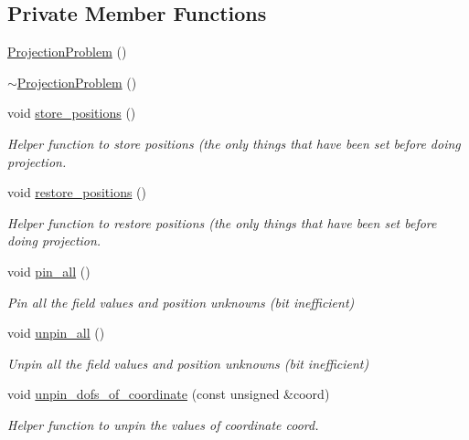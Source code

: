 \subsection*{Private Member Functions}
\begin{DoxyCompactItemize}
\item 
\hyperlink{classoomph_1_1ProjectionProblem_a4091e944bf95ae7b3cc86ac427d93257}{Projection\+Problem} ()
\item 
\hyperlink{classoomph_1_1ProjectionProblem_a2b18253c5a5f783a329307315e9ef69c}{$\sim$\+Projection\+Problem} ()
\item 
void \hyperlink{classoomph_1_1ProjectionProblem_a5518d9926a396536ea3d24a13e0a6a71}{store\+\_\+positions} ()
\begin{DoxyCompactList}\small\item\em Helper function to store positions (the only things that have been set before doing projection. \end{DoxyCompactList}\item 
void \hyperlink{classoomph_1_1ProjectionProblem_aeb3c03ed8381f389d3d598487b6fb987}{restore\+\_\+positions} ()
\begin{DoxyCompactList}\small\item\em Helper function to restore positions (the only things that have been set before doing projection. \end{DoxyCompactList}\item 
void \hyperlink{classoomph_1_1ProjectionProblem_a9c24751d48a454956517a8541c423cf2}{pin\+\_\+all} ()
\begin{DoxyCompactList}\small\item\em Pin all the field values and position unknowns (bit inefficient) \end{DoxyCompactList}\item 
void \hyperlink{classoomph_1_1ProjectionProblem_ac0b06207d156be752a3fccfab654826e}{unpin\+\_\+all} ()
\begin{DoxyCompactList}\small\item\em Unpin all the field values and position unknowns (bit inefficient) \end{DoxyCompactList}\item 
void \hyperlink{classoomph_1_1ProjectionProblem_a50b3643c4e6942755e1ede1c0ab417ec}{unpin\+\_\+dofs\+\_\+of\+\_\+coordinate} (const unsigned \&coord)
\begin{DoxyCompactList}\small\item\em Helper function to unpin the values of coordinate coord. \end{DoxyCompactList}\item 

\end{DoxyCompactItemize}
